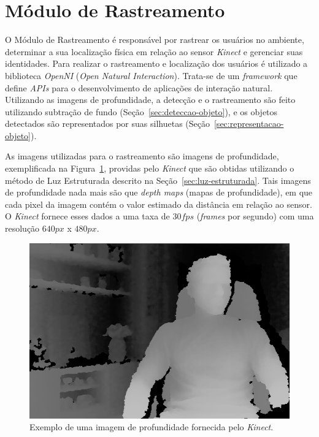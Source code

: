 \section{Módulo de Rastreamento}

	O Módulo de Rastreamento é responsável por rastrear os usuários no
	ambiente, determinar a sua localização física em relação ao sensor \textit{Kinect} e
	gerenciar suas identidades. Para realizar o rastreamento e localização dos
	usuários é utilizado a biblioteca \textit{OpenNI} (\textit{Open Natural
	Interaction}). Trata-se de um \textit{framework} que define \textit{APIs} para
	o desenvolvimento de aplicações de interação natural. Utilizando as imagens de
	profundidade, a detecção e o rastreamento são feito utilizando subtração de
	fundo (Seção~\ref{sec:deteccao-objeto}), e os objetos detectados são
	representados por suas silhuetas (Seção~\ref{sec:representacao-objeto}).

	As imagens utilizadas para o rastreamento são imagens de profundidade,
	exemplificada na Figura~\ref{fig:depthmaps}, providas pelo \textit{Kinect} que
	são obtidas utilizando o método de Luz Estruturada descrito na
	Seção~\ref{sec:luz-estruturada}. Tais imagens de profundidade nada mais são
	que \textit{depth maps} (mapas de profundidade), em que cada pixel da imagem
	contém o valor estimado da distância em relação ao sensor. O \textit{Kinect}
	fornece esses dados a uma taxa de $\displaystyle 30 fps$ (\textit{frames} por
	segundo) com uma resolução $\displaystyle 640px$ x $\displaystyle 480px$.
	

	\begin{figure}[hbt]
		\begin{center}
			\includegraphics[scale=0.4]{figuras/4.ProblemaEProposta/mapa-profundidade.png}
		\end{center}
		\caption{Exemplo de uma imagem de profundidade fornecida pelo \textit{Kinect}.}
		\label{fig:depthmaps}
	\end{figure}

